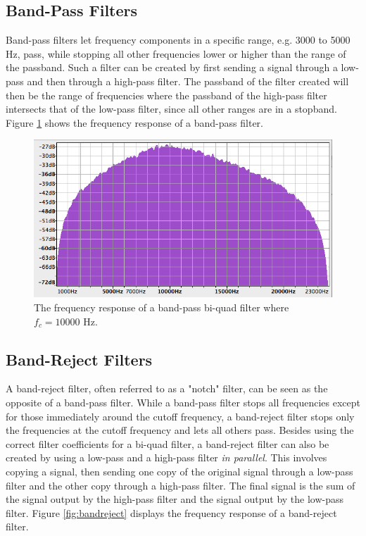 \subsection{Band-Pass Filters}

Band-pass filters let frequency components in a specific range, e.g. 3000 to 5000 Hz, pass, while stopping all other frequencies lower or higher than the range of the passband. Such a filter can be created by first sending a signal through a low-pass and then through a high-pass filter. The passband of the filter created will then be the range of frequencies where the passband of the high-pass filter intersects that of the low-pass filter, since all other ranges are in a stopband. Figure \ref{fig:bandpass} shows the frequency response of a band-pass filter.

\begin{figure}[p!]
  \includegraphics[scale=0.6]{img/bandpass}
  \caption{The frequency response of a band-pass bi-quad filter where $f_{c} = 10000$ Hz.}
  \label{fig:bandpass}
\end{figure}

\subsection{Band-Reject Filters}

A band-reject filter, often referred to as a "notch" filter, can be seen as the opposite of a band-pass filter. While a band-pass filter stops all frequencies except for those immediately around the cutoff frequency, a band-reject filter stops only the frequencies at the cutoff frequency and lets all others pass. Besides using the correct filter coefficients for a bi-quad filter, a band-reject filter can also be created by using a low-pass and a high-pass filter \emph{in parallel}. This involves copying a signal, then sending one copy of the original signal through a low-pass filter and the other copy through a high-pass filter. The final signal is the sum of the signal output by the high-pass filter and the signal output by the low-pass filter. Figure \ref{fig:bandreject} displays the frequency response of a band-reject filter.

